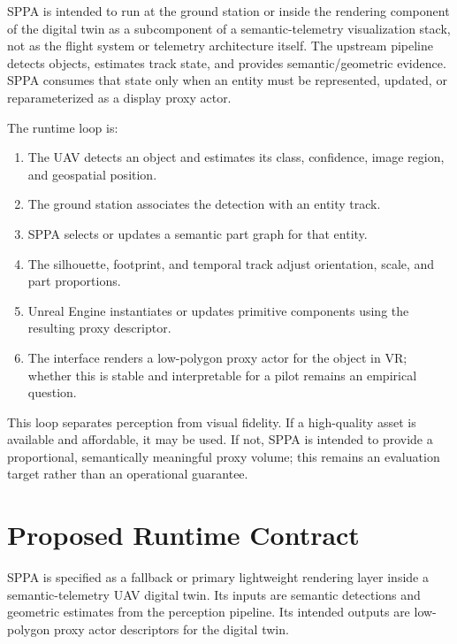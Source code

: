 ﻿\documentclass[11pt,a4paper]{article}
\begin{document}
SPPA is intended to run at the ground station or inside the rendering component
of the digital twin as a subcomponent of a semantic-telemetry visualization stack, not as the flight system or
telemetry architecture itself. The upstream pipeline detects objects, estimates
track state, and provides semantic/geometric evidence. SPPA consumes that state
only when an entity must be represented, updated, or reparameterized as a
display proxy actor.

The runtime loop is:

\begin{enumerate}
    \item The UAV detects an object and estimates its class, confidence, image
    region, and geospatial position.
    \item The ground station associates the detection with an entity track.
    \item SPPA selects or updates a semantic part graph for that entity.
    \item The silhouette, footprint, and temporal track adjust orientation,
    scale, and part proportions.
    \item Unreal Engine instantiates or updates primitive components using the
    resulting proxy descriptor.
    \item The interface renders a low-polygon proxy actor for the object in
    VR; whether this is stable and interpretable for a pilot remains an
    empirical question.
\end{enumerate}

This loop separates perception from visual fidelity. If a high-quality asset is
available and affordable, it may be used. If not, SPPA is intended to provide a
proportional, semantically meaningful proxy volume; this remains an evaluation
target rather than an operational guarantee.

\section{Proposed Runtime Contract}

SPPA is specified as a fallback or primary lightweight rendering layer inside
a semantic-telemetry UAV digital twin. Its inputs are semantic detections and geometric estimates from the
perception pipeline. Its intended outputs are low-polygon proxy actor
descriptors for the digital twin.
\end{document}
